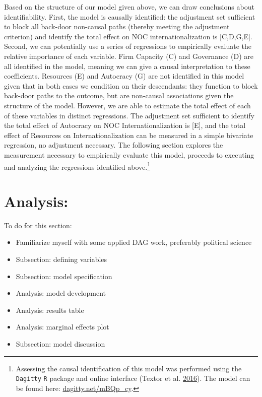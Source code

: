 \documentclass[11pt,]{book}
\providecommand{\tightlist}{%
  \setlength{\itemsep}{0pt}\setlength{\parskip}{0pt}}
\begin{document}
Based on the structure of our model given above, we can draw conclusions about identifiability. First, the model is causally identified: the adjustment set sufficient to block all back-door non-causal paths (thereby meeting the adjustment criterion) and identify the total effect on NOC internationalization is {[}C,D,G,E{]}. Second, we can potentially use a series of regressions to empirically evaluate the relative importance of each variable. Firm Capacity (C) and Governance (D) are all identified in the model, meaning we can give a causal interpretation to these coefficients. Resources (E) and Autocracy (G) are not identified in this model given that in both cases we condition on their descendants: they function to block back-door paths to the outcome, but are non-causal associations given the structure of the model. However, we are able to estimate the total effect of each of these variables in distinct regressions. The adjustment set sufficient to identify the total effect of Autocracy on NOC Internationalization is {[}E{]}, and the total effect of Resources on Internationalization can be measured in a simple bivariate regression, no adjustment necessary. The following section explores the measurement necessary to empirically evaluate this model, proceeds to executing and analyzing the regressions identified above.\footnote{Assessing the causal identification of this model was performed using the \texttt{Dagitty} \texttt{R} package and online interface (Textor et al. \protect\hyperlink{ref-textor_robust_2016}{2016}). The model can be found here: \url{dagitty.net/mBQp_cy}.}

\hypertarget{analysis02}{%
\section{Analysis:}\label{analysis02}}

To do for this section:

\begin{itemize}
\tightlist
\item
  Familiarize myself with some applied DAG work, preferably political science
\item
  Subsection: defining variables
\item
  Subsection: model specification
\item
  Analysis: model development
\item
  Analysis: results table
\item
  Analysis: marginal effects plot
\item
  Subsection: model discussion
\end{itemize}
\end{document}
